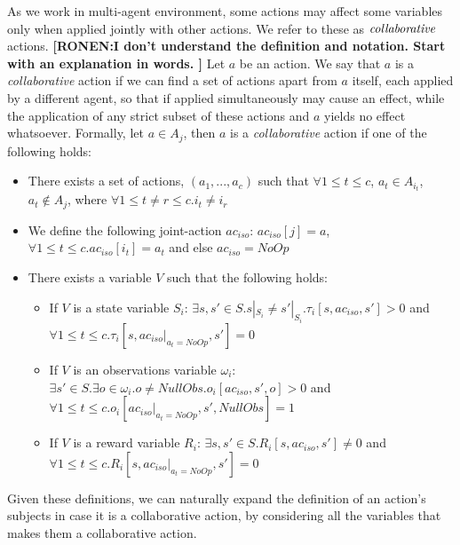 \documentclass[letterpaper]{article} %
\newcommand{\ronen}[1]{\textbf{[\color{blue}RONEN:#1]}}
\begin{document}
As we work in multi-agent environment, some actions may affect some variables only when applied jointly with other actions.
We refer to these as $\emph{collaborative}$ actions. 
\ronen{I don't understand the definition and notation. Start with an explanation in words. }
Let $a$ be an action. We say that $a$ is a \emph{collaborative} action if we can find a set of actions apart from $a$ itself, each applied by a different agent, so that if applied simultaneously may cause an effect, while the application of any strict subset of these actions and $a$ yields no effect whatsoever.
Formally, let $a\in A_j$, then $a$ is a \emph{collaborative} action if one of the following holds:
\begin{itemize}
    \item There exists a set of actions, $(a_1,..., a_c)$ such that $\forall 1\leq t \leq c$, $a_t\in A_{i_t}$, $a_t \not\in A_j$, where $\forall 1\leq t\neq r \leq c. i_t \neq i_r$
    \item We define the following joint-action $ac_{iso}$: $ac_{iso}[j]=a$, $\forall 1\leq t \leq c. ac_{iso}[i_t]=a_t$ and else $ac_{iso}=NoOp$
    \item There exists a variable $V$ such that the following holds:
    \begin{itemize}
        \item If $V$ is a state variable $S_i$: $\exists{s, s'\in S}.s|_{S_i} \neq s'|_{S_i}.\tau_i[s, ac_{iso}, s'] > 0$ and $\forall 1 \leq t \leq c.\tau_i[s, ac_{iso}|_{a_t=NoOp}, s'] = 0$
        \item If $V$ is an observations variable $\omega_i$: $\exists{s'\in S}.\exists{o\in \omega_i}.o \neq NullObs.o_i[ac_{iso}, s', o] > 0$ and $\forall 1\leq t \leq c.o_i[ac_{iso}|_{a_t=NoOp},s',NullObs]= 1$
        \item If $V$ is a reward variable $R_i$: $\exists{s, s'\in S}.R_i[s, ac_{iso}, s'] \neq 0$ and $\forall 1\leq t \leq c.R_i[s, ac_{iso}|_{a_t=NoOp}, s'] = 0$
    \end{itemize}
\end{itemize}
Given these definitions, we can naturally expand the definition of an action's subjects in case it is a collaborative action, by considering all the variables that makes them a collaborative action.
\end{document}
